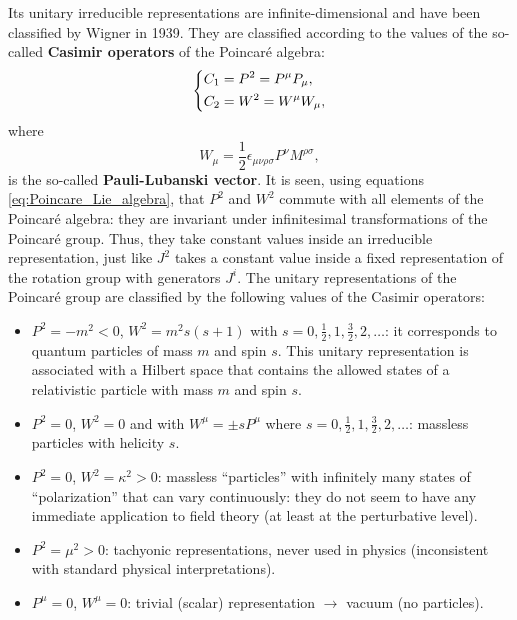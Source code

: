 Its unitary irreducible representations are infinite-dimensional and have been classified by Wigner in 1939. They are classified according to the values of the so-called \textbf{Casimir operators} of the Poincaré algebra:
\begin{equation}
    \begin{dcases}
        C_1 = P^2 = P^\mu P_\mu, \\
        C_2 = W^2 = W^\mu W_\mu,
    \end{dcases}
    \label{eq:Poincare_Casimir_operators}
\end{equation}
where
\begin{equation}
    W_\mu = \frac{1}{2}\epsilon_{\mu\nu\rho\sigma} P^\nu M^{\rho\sigma},
    \label{eq:Pauli_Lubanski_vector}
\end{equation}
is the so-called \textbf{Pauli-Lubanski vector}. It is seen, using equations \eqref{eq:Poincare_Lie_algebra}, that $P^2$ and $W^2$ commute with all elements of the Poincaré algebra: they are invariant under infinitesimal transformations of the Poincaré group. Thus, they take constant values inside an irreducible representation, just like $J^2$ takes a constant value inside a fixed representation of the rotation group with generators $J^i$. The unitary representations of the Poincaré group are classified by the following values of the Casimir operators:
\begin{itemize}
    \item $P^2 = -m^2 < 0$, $W^2 = m^2 s(s + 1)$ with $s = 0, \frac{1}{2}, 1, \frac{3}{2}, 2, \dots$: it corresponds to quantum
          particles of mass $m$ and spin $s$. This unitary representation is associated with a Hilbert space
          that contains the allowed states of a relativistic particle with mass $m$ and spin $s$.

    \item $P^2 = 0$, $W^2 = 0$ and with $W^\mu = \pm s P^\mu$ where $s = 0, \frac{1}{2}, 1, \frac{3}{2}, 2, \dots$: massless particles with
          helicity $s$.

    \item $P^2 = 0$, $W^2 = \kappa^2 > 0$: massless ``particles'' with infinitely many states of ``polarization''
          that can vary continuously: they do not seem to have any immediate application to field theory
          (at least at the perturbative level).

    \item $P^2 = \mu^2 > 0$: tachyonic representations, never used in physics (inconsistent with
          standard physical interpretations).

    \item $P^\mu = 0$, $W^\mu = 0$: trivial (scalar) representation $\rightarrow$ vacuum (no particles).
\end{itemize}

